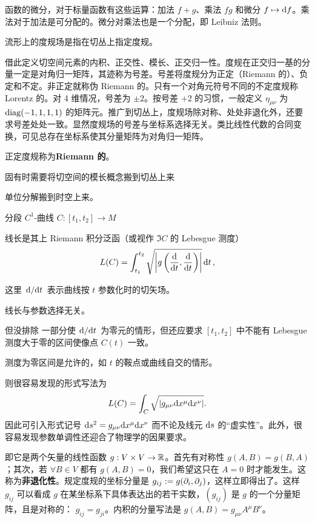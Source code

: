 函数的微分，对于标量函数有这些运算：加法 $f+g$、乘法 $fg$ 和微分 $f\mapsto\text df$。乘法对于加法是可分配的。微分对乘法也是一个分配，即 Leibniz 法则。

流形上的度规场是指在切丛上指定度规。

借此定义切空间元素的内积、正交性、模长、正交归一性。度规在正交归一基的分量一定是对角归一矩阵，其迹称为号差。号差将度规分为正定（Riemann 的）、负定和不定。非正定就称伪 Riemann 的。只有一个对角元符号不同的不定度规称 Lorentz 的。对 4 维情况，号差为 $\pm 2$。按号差 $+2$ 的习惯，一般定义 $\eta_{\mu\nu}$ 为 $\operatorname{diag}(-1,1,1,1)$ 的矩阵元。推广到切丛上，度规场除对称、处处非退化外，还要求号差处处一致。显然度规场的号差与坐标系选择无关。类比线性代数的合同变换，可见总存在坐标系使其分量矩阵为对角归一矩阵。

正定度规称为\textbf{Riemann 的}。

固有时需要将切空间的模长概念搬到切丛上来

单位分解搬到时空上来。

\begin{definition}
    分段 $C^1$-曲线 $C:[t_1,t_2]\to M$

线长是其上 Riemann 积分泛函（或视作 $\Im C$ 的 Lebesgue 测度）
    \[L(C)=\int_{t_1}^{t_2} \sqrt{\abs{g\left(\dv{t},\dv{t}\right)}}\dd{t},\]

    这里 $\dv*{t}$ 表示曲线按 $t$ 参数化时的切矢场。
\end{definition}

\begin{theorem}
    线长与参数选择无关。
\end{theorem}

\begin{remark}
    但没排除
    一部分使 $\dv*{t}$ 为零元的情形，但还应要求 $[t_1,t_2]$ 中不能有 Lebesgue 测度大于零的区间使像点 $C(t)$ 一致。
    
    测度为零区间是允许的，如 $t$ 的鞍点或曲线自交的情形。
\end{remark}
    
    则很容易发现的形式写法为
    \[
        L(C)=\int_C \sqrt{\abs{g_{\mu\nu}\dd x^\mu\dd x^\nu}}.
    \]
    因此可引入形式记号 $\dd s^2=g_{\mu\nu}\dd x^\mu\dd x^\nu$ 而不论及线元 $\dd s$ 的“虚实性”。此外，很容易发现参数单调性还迎合了物理学的因果要求。
    
即它是两个矢量的线性函数 $g:V\times V\to\mathbb{R}$。首先有对称性 $g(A,B)=g(B,A)$；其次，若 $\forall B\in V$ 都有 $g(A,B)=0$，我们希望这只在 $A=0$ 时才能发生。这称为\textbf{非退化性}。规定度规的坐标分量是 $g_{ij}:=g(\partial_i,\partial_j)$，这样立即得出了。这样 $g_{ij}$ 可以看成 $g$ 在某坐标系下具体表达出的若干实数，$(g_{ij})$ 是 $g$ 的一个分量矩阵，且是对称的：
 $g_{ij}=g_{ji}$。内积的分量写法是 $g( A, B)=g_{\mu\nu} A^\mu B^\nu$。
 

